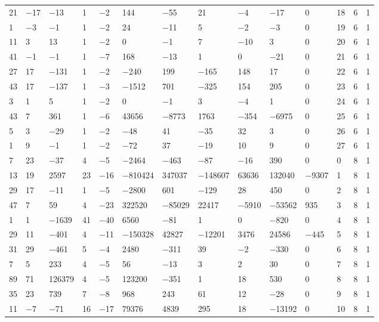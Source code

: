 \documentclass[pdftex]{sigma}
\numberwithin{equation}{section}
\theoremstyle{definition}
\numberwithin{table}{section}
\begin{document}
{\begin{paracol}{3}
\begin{supertabular}{|w{c}{.32cm}w{c}{.32cm}w{c}{.32cm}@{\hspace{.5cm}}w{c}{.2cm}w{c}{.2cm}|@{\hspace{\tabcolsep}}HHHHHHw{c}{.17cm}w{c}{.17cm}w{c}{.17cm}|}
			21 & $-$17 & $-$13 & 1 & $-$2 & 144 & $-$55 & 21 & $-$4 & $-$17 & 0 & 18 & 6 & 1 \\
			1 & $-$3 & $-$1 & 1 & $-$2 & 24 & $-$11 & 5 & $-$2 & $-$3 & 0 & 19 & 6 & 1 \\
			11 & 3 & 13 & 1 & $-$2 & 0 & $-$1 & 7 & $-$10 & 3 & 0 & 20 & 6 & 1 \\
			41 & $-$1 & $-$1 & 1 & $-$7 & 168 & $-$13 & 1 & 0 & $-$21 & 0 & 21 & 6 & 1 \\
			27 & 17 & $-$131 & 1 & $-$2 & $-$240 & 199 & $-$165 & 148 & 17 & 0 & 22 & 6 & 1 \\
			43 & 17 & $-$137 & 1 & $-$3 & $-$1512 & 701 & $-$325 & 154 & 205 & 0 & 23 & 6 & 1 \\
			3 & 1 & 5 & 1 & $-$2 & 0 & $-$1 & 3 & $-$4 & 1 & 0 & 24 & 6 & 1 \\
			43 & 7 & 361 & 1 & $-$6 & 43656 & $-$8773 & 1763 & $-$354 & $-$6975 & 0 & 25 & 6 & 1 \\
			5 & 3 & $-$29 & 1 & $-$2 & $-$48 & 41 & $-$35 & 32 & 3 & 0 & 26 & 6 & 1 \\
			1 & 9 & $-$1 & 1 & $-$2 & $-$72 & 37 & $-$19 & 10 & 9 & 0 & 27 & 6 & 1 \\
			7 & 23 & $-$37 & 4 & $-$5 & $-$2464 & $-$463 & $-$87 & $-$16 & 390 & 0 & 0 & 8 & 1 \\
			13 & 19 & 2597 & 23 & $-$16 & $-$810424 & 347037 & $-$148607 & 63636 & 132040 & $-$9307 & 1 & 8 & 1 \\
			29 & 17 & $-$11 & 1 & $-$5 & $-$2800 & 601 & $-$129 & 28 & 450 & 0 & 2 & 8 & 1 \\
			47 & 7 & 59 & 4 & $-$23 & 322520 & $-$85029 & 22417 & $-$5910 & $-$53562 & 935 & 3 & 8 & 1 \\
			1 & 1 & $-$1639 & 41 & $-$40 & 6560 & $-$81 & 1 & 0 & $-$820 & 0 & 4 & 8 & 1 \\
			29 & 11 & $-$401 & 4 & $-$11 & $-$150328 & 42827 & $-$12201 & 3476 & 24586 & $-$445 & 5 & 8 & 1 \\
			31 & 29 & $-$461 & 5 & $-$4 & 2480 & $-$311 & 39 & $-$2 & $-$330 & 0 & 6 & 8 & 1 \\
			7 & 5 & 233 & 4 & $-$5 & 56 & $-$13 & 3 & 2 & 30 & 0 & 7 & 8 & 1 \\
			89 & 71 & 126379 & 4 & $-$5 & 123200 & $-$351 & 1 & 18 & 530 & 0 & 8 & 8 & 1 \\
			35 & 23 & 739 & 7 & $-$8 & 968 & 243 & 61 & 12 & $-$28 & 0 & 9 & 8 & 1 \\
			11 & $-$7 & $-$71 & 16 & $-$17 & 79376 & 4839 & 295 & 18 & $-$13192 & 0 & 10 & 8 & 1 \\

\end{supertabular}
\end{paracol}}
\end{document}
